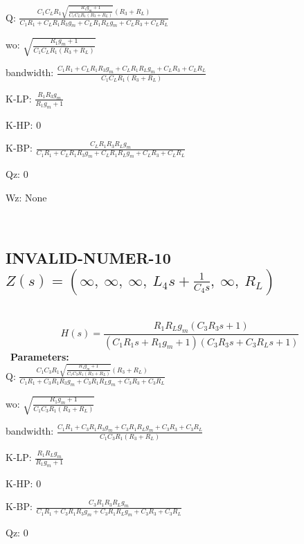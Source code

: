 \documentclass{article}
\begin{document}
Q: $\frac{C_{1} C_{L} R_{1} \sqrt{\frac{R_{1} g_{m} + 1}{C_{1} C_{L} R_{1} \left(R_{3} + R_{L}\right)}} \left(R_{3} + R_{L}\right)}{C_{1} R_{1} + C_{L} R_{1} R_{3} g_{m} + C_{L} R_{1} R_{L} g_{m} + C_{L} R_{3} + C_{L} R_{L}}$\ 

wo: $\sqrt{\frac{R_{1} g_{m} + 1}{C_{1} C_{L} R_{1} \left(R_{3} + R_{L}\right)}}$\ 

bandwidth: $\frac{C_{1} R_{1} + C_{L} R_{1} R_{3} g_{m} + C_{L} R_{1} R_{L} g_{m} + C_{L} R_{3} + C_{L} R_{L}}{C_{1} C_{L} R_{1} \left(R_{3} + R_{L}\right)}$\ 

K-LP: $\frac{R_{1} R_{3} g_{m}}{R_{1} g_{m} + 1}$\ 

K-HP: $0$\ 

K-BP: $\frac{C_{L} R_{1} R_{3} R_{L} g_{m}}{C_{1} R_{1} + C_{L} R_{1} R_{3} g_{m} + C_{L} R_{1} R_{L} g_{m} + C_{L} R_{3} + C_{L} R_{L}}$\ 

Qz: $0$\ 

Wz: $\text{None}$\ 

\ 

\subsection{INVALID-NUMER-10 $Z(s) = \left( \infty, \  \infty, \  \infty, \  L_{4} s + \frac{1}{C_{4} s}, \  \infty, \  R_{L}\right)$ } \ 
\textbf{\[H(s) = \frac{R_{1} R_{L} g_{m} \left(C_{3} R_{3} s + 1\right)}{\left(C_{1} R_{1} s + R_{1} g_{m} + 1\right) \left(C_{3} R_{3} s + C_{3} R_{L} s + 1\right)}\] } \ 
\textbf{Parameters:}\\ 

Q: $\frac{C_{1} C_{3} R_{1} \sqrt{\frac{R_{1} g_{m} + 1}{C_{1} C_{3} R_{1} \left(R_{3} + R_{L}\right)}} \left(R_{3} + R_{L}\right)}{C_{1} R_{1} + C_{3} R_{1} R_{3} g_{m} + C_{3} R_{1} R_{L} g_{m} + C_{3} R_{3} + C_{3} R_{L}}$\ 

wo: $\sqrt{\frac{R_{1} g_{m} + 1}{C_{1} C_{3} R_{1} \left(R_{3} + R_{L}\right)}}$\ 

bandwidth: $\frac{C_{1} R_{1} + C_{3} R_{1} R_{3} g_{m} + C_{3} R_{1} R_{L} g_{m} + C_{3} R_{3} + C_{3} R_{L}}{C_{1} C_{3} R_{1} \left(R_{3} + R_{L}\right)}$\ 

K-LP: $\frac{R_{1} R_{L} g_{m}}{R_{1} g_{m} + 1}$\ 

K-HP: $0$\ 

K-BP: $\frac{C_{3} R_{1} R_{3} R_{L} g_{m}}{C_{1} R_{1} + C_{3} R_{1} R_{3} g_{m} + C_{3} R_{1} R_{L} g_{m} + C_{3} R_{3} + C_{3} R_{L}}$\ 

Qz: $0$\ 
\end{document}
